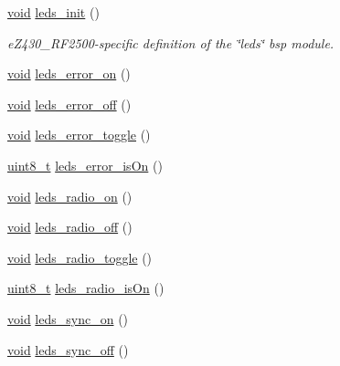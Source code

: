 \begin{DoxyCompactItemize}
\item 
\hyperlink{usb__devapi_8h_afabf60e7f57651d6d595a02c75f07cd0}{void} \hyperlink{group__leds_ga67cfc3137a465e560792490e81365254}{leds\+\_\+init} ()
\begin{DoxyCompactList}\small\item\em e\+Z430\+\_\+\+R\+F2500-\/specific definition of the \char`\"{}leds\char`\"{} bsp module. \end{DoxyCompactList}\item 
\hyperlink{usb__devapi_8h_afabf60e7f57651d6d595a02c75f07cd0}{void} \hyperlink{group__leds_ga248d93c2ed295c1c463984b881e1b9af}{leds\+\_\+error\+\_\+on} ()
\item 
\hyperlink{usb__devapi_8h_afabf60e7f57651d6d595a02c75f07cd0}{void} \hyperlink{group__leds_ga4639337fca09b91f2136c2843a19e1b3}{leds\+\_\+error\+\_\+off} ()
\item 
\hyperlink{usb__devapi_8h_afabf60e7f57651d6d595a02c75f07cd0}{void} \hyperlink{group__leds_gaa0f84f5b86315c3eed24fc48a826f991}{leds\+\_\+error\+\_\+toggle} ()
\item 
\hyperlink{_p_e___types_8h_aba7bc1797add20fe3efdf37ced1182c5}{uint8\+\_\+t} \hyperlink{group__leds_ga49f878b007c160726b61f01fa6afce85}{leds\+\_\+error\+\_\+is\+On} ()
\item 
\hyperlink{usb__devapi_8h_afabf60e7f57651d6d595a02c75f07cd0}{void} \hyperlink{group__leds_gabadb9503b7f4bdff557b9f200d52d47e}{leds\+\_\+radio\+\_\+on} ()
\item 
\hyperlink{usb__devapi_8h_afabf60e7f57651d6d595a02c75f07cd0}{void} \hyperlink{group__leds_ga511a7d73ce107a86e36efdf9c8937f96}{leds\+\_\+radio\+\_\+off} ()
\item 
\hyperlink{usb__devapi_8h_afabf60e7f57651d6d595a02c75f07cd0}{void} \hyperlink{group__leds_ga428daeb3c44d268ad8bc6ab2ac3aa555}{leds\+\_\+radio\+\_\+toggle} ()
\item 
\hyperlink{_p_e___types_8h_aba7bc1797add20fe3efdf37ced1182c5}{uint8\+\_\+t} \hyperlink{group__leds_ga49e6fda7ecdef801f2cdddde02850ba3}{leds\+\_\+radio\+\_\+is\+On} ()
\item 
\hyperlink{usb__devapi_8h_afabf60e7f57651d6d595a02c75f07cd0}{void} \hyperlink{group__leds_gaf1a59644fa7758343d6666e18a4c484c}{leds\+\_\+sync\+\_\+on} ()
\item 
\hyperlink{usb__devapi_8h_afabf60e7f57651d6d595a02c75f07cd0}{void} \hyperlink{group__leds_gafe7544b92ce4fb0eccb46179741ac32b}{leds\+\_\+sync\+\_\+off} ()
\item 

\end{DoxyCompactItemize}
